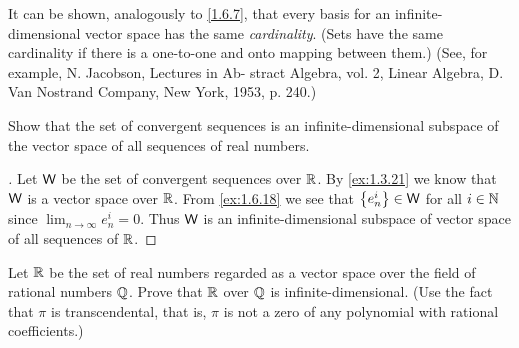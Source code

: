 \begin{note}
  It can be shown, analogously to \cref{1.6.7}, that every basis for an infinite-dimensional vector space has the same \emph{cardinality}.
  (Sets have the same cardinality if there is a one-to-one and onto mapping between them.)
  (See, for example, N. Jacobson, Lectures in Ab- stract Algebra, vol. 2, Linear Algebra, D. Van Nostrand Company, New York, 1953, p. 240.)
\end{note}

\exercisesection

\setcounter{ex}{1}
\begin{ex}\label{ex:1.7.2}
  Show that the set of convergent sequences is an infinite-dimensional subspace of the vector space of all sequences of real numbers.
\end{ex}

\begin{proof}[]
  Let \(\mathsf{W}\) be the set of convergent sequences over \(\mathbb{R}\).
  By \cref{ex:1.3.21} we know that \(\mathsf{W}\) is a vector space over \(\mathbb{R}\).
  From \cref{ex:1.6.18} we see that \(\left\lbrace e_n^i\right\rbrace \in \mathsf{W}\) for all \(i \in \mathbb{N}\) since \(\lim_{n \to \infty} e_n^i = 0\).
  Thus \(\mathsf{W}\) is an infinite-dimensional subspace of vector space of all sequences of \(\mathbb{R}\).
\end{proof}

\begin{ex}\label{ex:1.7.3}
  Let \(\mathbb{R}\) be the set of real numbers regarded as a vector space over the field of rational numbers \(\mathbb{Q}\).
  Prove that \(\mathbb{R}\) over \(\mathbb{Q}\) is infinite-dimensional.
  (Use the fact that \(\pi\) is transcendental, that is, \(\pi\) is not a zero of any polynomial with rational coefficients.)
\end{ex}

